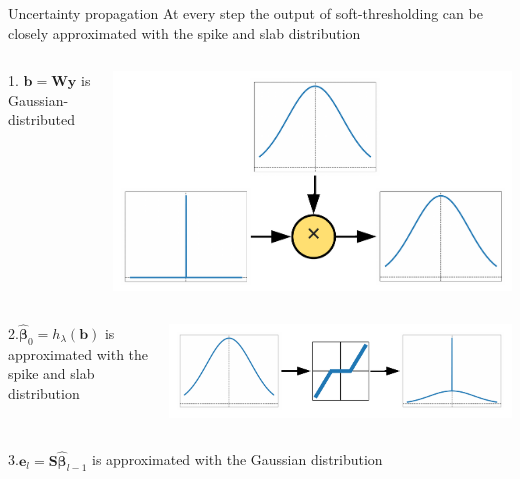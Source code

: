 \documentclass[9pt]{beamer}
\begin{document}
  \begin{frame}{Uncertainty propagation}
      At every step the output of soft-thresholding can be closely approximated with the spike and slab distribution
      \begin{columns}
        \begin{column}{0.33\textwidth}
      1. \(\mathbf{b} = \mathbf{W}\mathbf{y}\) is Gaussian-distributed
    \end{column}
    \begin{column}{0.67\textwidth}
        \includegraphics[width=0.75\columnwidth]{graphics/gauss_delta.pdf}
      \end{column}
    \end{columns}
    \begin{columns}
      \begin{column}{0.33\textwidth}
      2.\(\widehat{\boldsymbol\beta}_{0} = h_\lambda(\mathbf{b})\) is approximated with the spike and slab distribution
    \end{column}
    \begin{column}{0.67\textwidth}
        \includegraphics[width=0.75\columnwidth]{graphics/spsl_propagation.pdf}
      \end{column}
    \end{columns}
    \begin{columns}
      \begin{column}{0.33\textwidth}
      3.\(\mathbf{e}_l = \mathbf{S}\widehat{\boldsymbol\beta}_{l-1}\) is approximated with the Gaussian distribution
    \end{column}
    \begin{column}{0.67\textwidth}

\end{column}
\end{columns}
\end{frame}
\end{document}
